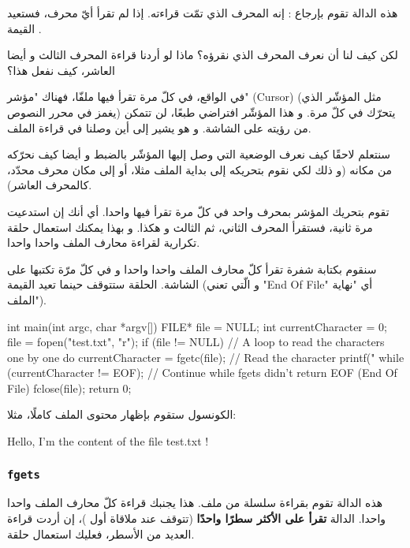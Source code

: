 هذه الدالة تقوم بإرجاع
:
إنه المحرف الذي تمّت قراءته.
إذا لم تقرأ أيّ محرف، فستعيد القيمة
.

\begin{question}
لكن كيف لنا أن نعرف المحرف الذي نقرؤه؟ ماذا لو أردنا قراءة المحرف الثالث و أيضا العاشر، كيف نفعل هذا؟
\end{question}

في الواقع، في كلّ مرة تقرأ فيها ملفّا، فهناك "مؤشر"
(\textenglish{Cursor})
(مثل المؤشّر الذي يغمز في محرر النصوص) يتحرّك في كلّ مرة. و هذا المؤشّر افتراضي طبعًا، لن تتمكن من رؤيته على الشاشة. و هو يشير إلى أين وصلنا في قراءة الملف.

سنتعلم لاحقًا كيف نعرف الوضعية التي وصل إليها المؤشّر بالضبط و أيضا كيف نحرّكه من مكانه (و ذلك لكي نقوم بتحريكه إلى بداية الملف مثلا، أو إلى مكان محرف محدّد، كالمحرف العاشر).

تقوم بتحريك المؤشر بمحرف واحد في كلّ مرة تقرأ فيها واحدا. أي أنك إن استدعيت
مرة ثانية، فستقرأ المحرف الثاني، ثم الثالث و هكذا. و بهذا يمكنك استعمال حلقة تكرارية لقراءة محارف الملف واحدا واحدا.

سنقوم بكتابة شفرة تقرأ كلّ محارف الملف واحدا واحدا و في كلّ مرّة تكتبها على الشاشة. الحلقة ستتوقف حينما تعيد
القيمة
(و الّتي تعني
"\textenglish{End Of File}"
أي "نهاية الملف").

\begin{Csource}
int main(int argc, char *argv[])
{
	FILE* file = NULL;
	int currentCharacter = 0;
	file = fopen("test.txt", "r");
	if (file != NULL)
	{
  		// A loop to read the characters one by one
  		do
  		{
    			currentCharacter = fgetc(file); // Read the character
    			printf("%
  		} while (currentCharacter != EOF); // Continue while fgets didn't return EOF (End Of File)
  		fclose(file);
	}
	return 0;
}
\end{Csource}

الكونسول ستقوم بإظهار محتوى الملف كاملًا، مثلا:

\begin{Console}
Hello, I'm the content of the file test.txt !
\end{Console}

\subsubsection{\texttt{fgets}}

هذه الدالة تقوم بقراءة سلسلة من ملف. هذا يجنبك قراءة كلّ محارف الملف واحدا واحدا. الدالة
\textbf{تقرأ على الأكثر سطرًا واحدًا}
(تتوقف عند ملاقاة أول
)،
إن أردت قراءة العديد من الأسطر، فعليك استعمال حلقة.

